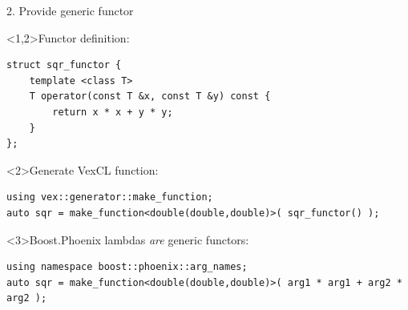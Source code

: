 \documentclass[@BEAMER_OPTIONS@]{beamer}
\begin{document}
\begin{frame}[fragile]{2. Provide generic functor}
    \begin{exampleblock}<1,2>{Functor definition:}
        \begin{lstlisting}
struct sqr_functor {
    template <class T>
    T operator(const T &x, const T &y) const {
        return x * x + y * y;
    }
};
        \end{lstlisting}
    \end{exampleblock}
    \pause
    \begin{exampleblock}<2>{Generate VexCL function:}
        \begin{lstlisting}
using vex::generator::make_function;
auto sqr = make_function<double(double,double)>( sqr_functor() );
        \end{lstlisting}
    \end{exampleblock}
    \vspace{0.5\baselineskip}
    \begin{exampleblock}<3>{Boost.Phoenix lambdas \emph{are} generic functors:}
        \begin{lstlisting}
using namespace boost::phoenix::arg_names;
auto sqr = make_function<double(double,double)>( arg1 * arg1 + arg2 * arg2 );
        \end{lstlisting}
    \end{exampleblock}
\end{frame}

\note{ }
\end{document}
